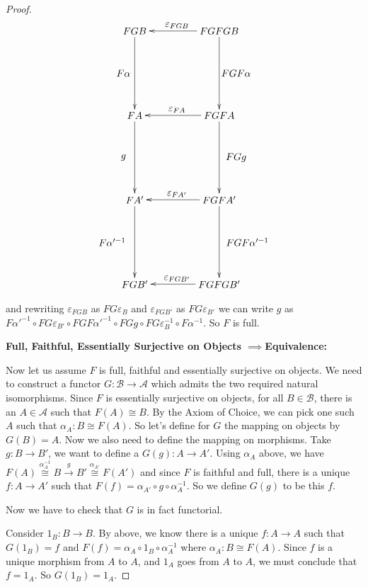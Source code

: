 \documentclass[11pt]{article}
\theoremstyle{definition}
\theoremstyle{plain}
\theoremstyle{plain}
\theoremstyle{plain}
\newcommand\w{30}
\newcommand\x{30}
\newcommand\y{60}
\newcommand\z{90}
\begin{document}
\begin{proof}
\begin{equation*}
\begin{xy}
(0,0)*+{FGB}="v1"; (\w,0)*+{FGFGB}="v2";%
(0,-\x)*+{FA}="v3"; (\w,-\x)*+{FGFA}="v4";%
(0,-\y)*+{FA'}="v5"; (\w,-\y)*+{FGFA'}="v6";%
(0,-\z)*+{FGB'}="v7";(\w,-\z)*+{FGFGB'}="v8";
{\ar "v1";"v3"}?*!/^4mm/{F\alpha};
{\ar "v3";"v5"}?*!/^4mm/{g};
{\ar "v5";"v7"}?*!/^8mm/{F\alpha'^{-1}};
{\ar "v2";"v4"}?*!/_6mm/{FGF\alpha};
{\ar "v4";"v6"}?*!/_6mm/{FGg};
{\ar "v6";"v8"}?*!/_10mm/{FGF\alpha'^{-1}};
{\ar "v2";"v1"}?*!/^2mm/{\varepsilon_{FGB}};
{\ar "v4";"v3"}?*!/^2mm/{\varepsilon_{FA}};
{\ar "v6";"v5"}?*!/^2mm/{\varepsilon_{FA'}};
{\ar "v8";"v7"}?*!/^2mm/{\varepsilon_{FGB'}};
\end{xy}
\end{equation*}

and rewriting $\varepsilon_{FGB}$ as $FG\varepsilon_{B}$ and $\varepsilon_{FGB'}$ as $FG\varepsilon_{B'}$ we can write $g$ as $F\alpha'^{-1} \circ FG\varepsilon_{B'} \circ FGF\alpha'^{-1} \circ FGg \circ FG\varepsilon_{B}^{-1} \circ F\alpha^{-1}$. So $F$ is full.

\textbf{Full, Faithful, Essentially Surjective on Objects $\implies$Equivalence:} 

Now let us assume $F$ is full, faithful and essentially surjective on objects. We need to construct a functor $G:\mathscr{B}\to\mathscr{A}$ which admits the two required natural isomorphisms. Since $F$ is essentially surjective on objects, for all $B\in\mathscr{B}$, there is an $A\in\mathscr{A}$ such that $F(A)\cong B$. By the Axiom of Choice, we can pick one such $A$ such that $\alpha_{A}:B\cong F(A)$. So let's define for $G$ the mapping on objects by $G(B)=A$. Now we also need to define the mapping on morphisms. Take $g:B\to B'$, we want to define a $G(g):A\to A'$. Using $\alpha_{A}$ above, we have $F(A)\overset{\alpha_{A}^{-1}}{\cong}B\overset{g}{\rightarrow}B'\overset{\alpha_{A'}}{\cong}F(A')$ and since $F$ is faithful and full, there is a unique $f:A\to A'$ such that $F(f)=\alpha_{A'} \circ g \circ \alpha_{A}^{-1}$. So we define $G(g)$ to be this $f$.

Now we have to check that $G$ is in fact functorial.

Consider $1_{B}:B\to B$. By above, we know there is a unique $f:A\to A$ such that $G(1_{B})=f$ and $F(f)=\alpha_{A} \circ 1_{B} \circ \alpha_{A}^{-1}$ where $\alpha_{A}:B \cong F(A)$. Since $f$ is a unique morphism from $A$ to $A$, and $1_{A}$ goes from $A$ to $A$, we must conclude that $f=1_{A}$. So $G(1_{B})=1_{A}$.


\end{proof}
\end{document}

